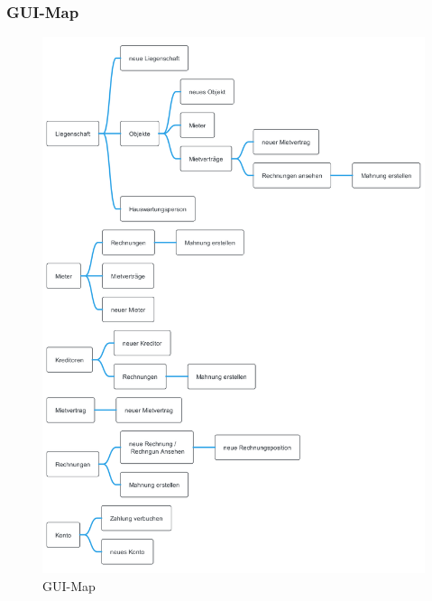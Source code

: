 \subsubsection{GUI-Map}
\vspace*{-1cm}
\begin{figure}[H]
  \begin{center}
    \includegraphics[height=1\textheight]{content/diagrams/out/guiMap/GuiMindMap.png}
    \caption{GUI-Map}
    \label{guiMap}
  \end{center}
\end{figure}

